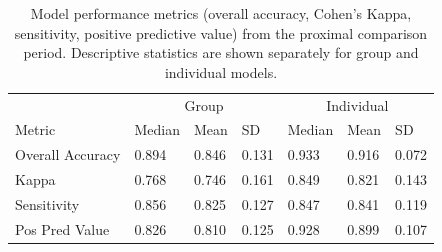 \documentclass[
  man]{apa6}
\begin{document}
\begin{table}[tbp]

\begin{center}
\begin{threeparttable}

\caption{\label{tab:metrics-table}Model performance metrics (overall accuracy, Cohen's Kappa, sensitivity, positive predictive value) from the proximal comparison period. Descriptive statistics are shown separately for group and individual models.}

\begin{tabular}{lllllll}
\toprule
 & \multicolumn{3}{c}{Group} & \multicolumn{3}{c}{Individual} \\
\cmidrule(r){2-4} \cmidrule(r){5-7}
Metric & Median & Mean & SD & Median & Mean & SD\\
\midrule
Overall Accuracy & 0.894 & 0.846 & 0.131 & 0.933 & 0.916 & 0.072\\
Kappa & 0.768 & 0.746 & 0.161 & 0.849 & 0.821 & 0.143\\
Sensitivity & 0.856 & 0.825 & 0.127 & 0.847 & 0.841 & 0.119\\
Pos Pred Value & 0.826 & 0.810 & 0.125 & 0.928 & 0.899 & 0.107\\
\bottomrule
\end{tabular}

\end{threeparttable}
\end{center}

\end{table}

\renewcommand{\arraystretch}{.75}
\end{document}
